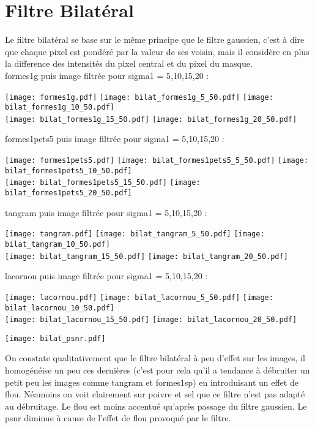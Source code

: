\documentclass[12pt]{article}
\numberwithin{equation}{section}
\begin{document}
\section{Filtre Bilatéral}
Le filtre bilatéral se base sur le même principe que le filtre gaussien, c'est à dire que chaque pixel est pondéré par la valeur de ses voisin, mais il considère en plus la difference des intensités du pixel  central et du pixel du masque.\\ 
formes1g puis image filtrée pour sigma1 = 5,10,15,20 :\\
\begin{center}
\texttt{[image: formes1g.pdf]}
\texttt{[image: bilat\_formes1g\_5\_50.pdf]}
\texttt{[image: bilat\_formes1g\_10\_50.pdf]}\\
\texttt{[image: bilat\_formes1g\_15\_50.pdf]}
\texttt{[image: bilat\_formes1g\_20\_50.pdf]}
\end{center}
formes1pets5 puis image filtrée pour sigma1 = 5,10,15,20 :\\
\begin{center}
\texttt{[image: formes1pets5.pdf]}
\texttt{[image: bilat\_formes1pets5\_5\_50.pdf]}
\texttt{[image: bilat\_formes1pets5\_10\_50.pdf]}\\
\texttt{[image: bilat\_formes1pets5\_15\_50.pdf]}
\texttt{[image: bilat\_formes1pets5\_20\_50.pdf]}
\end{center}
tangram puis image filtrée pour sigma1 = 5,10,15,20 :\\
\begin{center}
\texttt{[image: tangram.pdf]}
\texttt{[image: bilat\_tangram\_5\_50.pdf]}
\texttt{[image: bilat\_tangram\_10\_50.pdf]}\\
\texttt{[image: bilat\_tangram\_15\_50.pdf]}
\texttt{[image: bilat\_tangram\_20\_50.pdf]}
\end{center}
lacornou puis image filtrée pour sigma1 = 5,10,15,20 :\\
\begin{center}
\texttt{[image: lacornou.pdf]}
\texttt{[image: bilat\_lacornou\_5\_50.pdf]}
\texttt{[image: bilat\_lacornou\_10\_50.pdf]}\\
\texttt{[image: bilat\_lacornou\_15\_50.pdf]}
\texttt{[image: bilat\_lacornou\_20\_50.pdf]}
\end{center}

\begin{center}
\texttt{[image: bilat\_psnr.pdf]}\\
\end{center}

On constate qualitativement que le filtre bilatéral à peu d'effet sur les images, il homogénéise un peu ces dernières (c'est pour cela qu'il a tendance à débruiter un petit peu les images comme tangram et formes1sp) en introduisant un effet de flou. Néamoins on voit clairement sur poivre et sel que ce filtre n'est pas adapté au débruitage. Le flou est moins accentué qu'après passage du filtre gaussien. Le psnr diminue à cause de l'effet de flou provoqué par le filtre.
\end{document}
